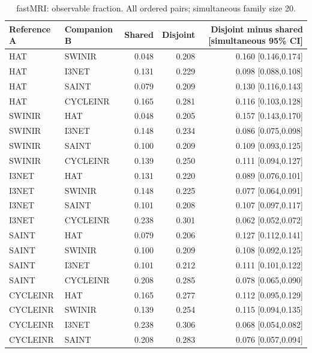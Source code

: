 \begin{table}[t]\centering\small
\caption{fastMRI: observable fraction. All ordered pairs; simultaneous family size 20.}
\begin{tabular}{llrrr}\toprule Reference A & Companion B & Shared & Disjoint & Disjoint minus shared [simultaneous 95\% CI]\\\midrule
HAT & SWINIR & 0.048 & 0.208 & 0.160 [0.146,0.174] \\
HAT & I3NET & 0.131 & 0.229 & 0.098 [0.088,0.108] \\
HAT & SAINT & 0.079 & 0.209 & 0.130 [0.116,0.143] \\
HAT & CYCLEINR & 0.165 & 0.281 & 0.116 [0.103,0.128] \\
SWINIR & HAT & 0.048 & 0.205 & 0.157 [0.143,0.170] \\
SWINIR & I3NET & 0.148 & 0.234 & 0.086 [0.075,0.098] \\
SWINIR & SAINT & 0.100 & 0.209 & 0.109 [0.093,0.125] \\
SWINIR & CYCLEINR & 0.139 & 0.250 & 0.111 [0.094,0.127] \\
I3NET & HAT & 0.131 & 0.220 & 0.089 [0.076,0.101] \\
I3NET & SWINIR & 0.148 & 0.225 & 0.077 [0.064,0.091] \\
I3NET & SAINT & 0.101 & 0.208 & 0.107 [0.097,0.117] \\
I3NET & CYCLEINR & 0.238 & 0.301 & 0.062 [0.052,0.072] \\
SAINT & HAT & 0.079 & 0.206 & 0.127 [0.112,0.141] \\
SAINT & SWINIR & 0.100 & 0.209 & 0.108 [0.092,0.125] \\
SAINT & I3NET & 0.101 & 0.212 & 0.111 [0.101,0.122] \\
SAINT & CYCLEINR & 0.208 & 0.285 & 0.078 [0.065,0.090] \\
CYCLEINR & HAT & 0.165 & 0.277 & 0.112 [0.095,0.129] \\
CYCLEINR & SWINIR & 0.139 & 0.254 & 0.115 [0.094,0.135] \\
CYCLEINR & I3NET & 0.238 & 0.306 & 0.068 [0.054,0.082] \\
CYCLEINR & SAINT & 0.208 & 0.283 & 0.076 [0.057,0.094] \\
\bottomrule\end{tabular}\end{table}
